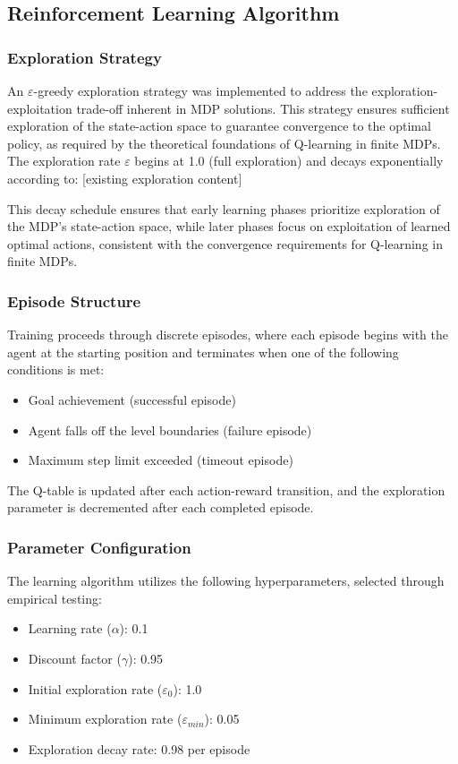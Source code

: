 \subsection{Reinforcement Learning Algorithm}

\subsubsection{Exploration Strategy}
An $\varepsilon$-greedy exploration strategy was implemented to address the exploration-exploitation trade-off inherent in MDP solutions. This strategy ensures sufficient exploration of the state-action space to guarantee convergence to the optimal policy, as required by the theoretical foundations of Q-learning in finite MDPs. The exploration rate $\varepsilon$ begins at 1.0 (full exploration) and decays exponentially according to:
[existing exploration content]

This decay schedule ensures that early learning phases prioritize exploration of the MDP's state-action space, while later phases focus on exploitation of learned optimal actions, consistent with the convergence requirements for Q-learning in finite MDPs.

\subsubsection{Episode Structure}
Training proceeds through discrete episodes, where each episode begins with the agent at the starting position and terminates when one of the following conditions is met:
\begin{itemize}
    \item Goal achievement (successful episode)
    \item Agent falls off the level boundaries (failure episode)  
    \item Maximum step limit exceeded (timeout episode)
\end{itemize}

The Q-table is updated after each action-reward transition, and the exploration parameter is decremented after each completed episode.

\subsubsection{Parameter Configuration}
The learning algorithm utilizes the following hyperparameters, selected through empirical testing:
\begin{itemize}
    \item Learning rate ($\alpha$): 0.1
    \item Discount factor ($\gamma$): 0.95
    \item Initial exploration rate ($\varepsilon_0$): 1.0
    \item Minimum exploration rate ($\varepsilon_{min}$): 0.05
    \item Exploration decay rate: 0.98 per episode
\end{itemize}

